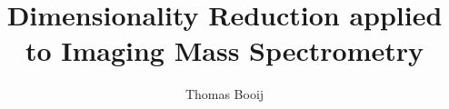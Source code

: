 \documentclass{tudelft-report}
\begin{document}
\frontmatter

\title[The evaluation of state of the art methods.]{Dimensionality Reduction applied to Imaging Mass Spectrometry}
\author{Thomas Booij}
\makecover





\tableofcontents

\mainmatter



\appendix

%


\end{document}
